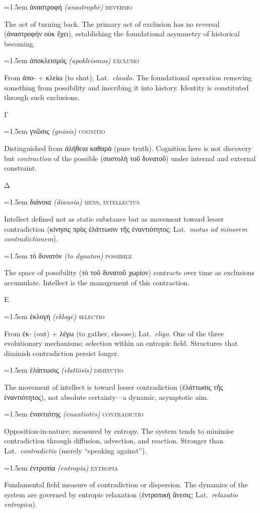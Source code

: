 \documentclass[12pt, oneside, openany]{memoir}
\newcommand{\gk}[1]{\textgreek{#1}}
\newcommand{\gkblue}[1]{{\color{greekblue}\textgreek{#1}}}
\newcommand{\gentry}[4]{%
  \noindent\hangindent=1.5em
  {\gkblue{#1}}\enspace
  {\itshape(#2)}\enspace
  {\color{rubricate}\textperiodcentered}\enspace
  {\scshape #3}\par
  \hspace*{1.5em}%
  \parbox[t]{\dimexpr\linewidth-1.5em\relax}{\strut#4\strut}%
  \par\addvspace{6pt}}
\begin{document}
\gentry{ἀναστροφή}{anastroph\={e}}{reversio}
{The act of turning back. The primary act of exclusion has no reversal (\gk{ἀναστροφὴν οὐκ ἔχει}), establishing the foundational asymmetry of historical becoming.}

\gentry{ἀποκλεισμός}{apokleismos}{exclusio}
{From \gk{ἀπο-} + \gk{κλείω} (to shut); Lat.\ \textit{claudo}. The foundational operation removing something from possibility and inscribing it into history. Identity is constituted through such exclusions.}

\bigskip
{\centering\color{rubricate}\large\scshape Γ \par}\medskip

\gentry{γνῶσις}{gn\={o}sis}{cognitio}
{Distinguished from \gk{ἀλήθεια καθαρά} (pure truth). Cognition here is not discovery but \emph{contraction} of the possible (\gk{συστολὴ τοῦ δυνατοῦ}) under internal and external constraint.}

\bigskip
{\centering\color{rubricate}\large\scshape Δ \par}\medskip

\gentry{διάνοια}{dianoia}{mens, intellectus}
{Intellect defined not as static substance but as movement toward lesser contradiction (\gk{κίνησις πρὸς ἐλάττωσιν τῆς ἐναντιότητος}; Lat.\ \textit{motus ad minorem contradictionem}).}

\gentry{τὸ δυνατόν}{to dynaton}{possibile}
{The space of possibility (\gk{τὸ τοῦ δυνατοῦ χωρίον}) contracts over time as exclusions accumulate. Intellect is the management of this contraction.}

\bigskip
{\centering\color{rubricate}\large\scshape Ε \par}\medskip

\gentry{ἐκλογή}{eklog\={e}}{selectio}
{From \gk{ἐκ-} (out) + \gk{λέγω} (to gather, choose); Lat.\ \textit{eligo}. One of the three evolutionary mechanisms: selection within an entropic field. Structures that diminish contradiction persist longer.}

\gentry{ἐλάττωσις}{elatt\={o}sis}{diminutio}
{The movement of intellect is toward lesser contradiction (\gk{ἐλάττωσις τῆς ἐναντιότητος}), not absolute certainty---a dynamic, asymptotic aim.}

\gentry{ἐναντιότης}{enantiot\={e}s}{contradictio}
{Opposition-in-nature; measured by entropy. The system tends to minimise contradiction through diffusion, advection, and reaction. Stronger than Lat.\ \textit{contradictio} (merely ``speaking against'').}

\gentry{ἐντροπία}{entropia}{entropia}
{Fundamental field measure of contradiction or dispersion. The dynamics of the system are governed by entropic relaxation (\gk{ἐντροπικὴ ἄνεσις}; Lat.\ \textit{relaxatio entropica}).}
\end{document}
